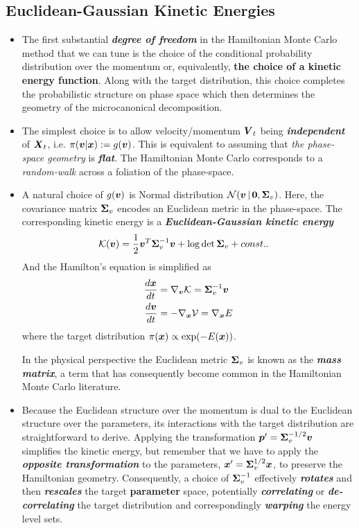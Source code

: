 \documentclass[11pt]{article}
\begin{document}
\subsection{Euclidean-Gaussian Kinetic Energies}
\begin{itemize}
\item The first substantial \textbf{\emph{degree of freedom}} in the Hamiltonian Monte Carlo method that we can tune is the choice of the conditional probability distribution over the momentum or, equivalently, \textbf{the choice of a kinetic energy function}. Along with the target distribution, this choice completes the probabilistic structure on phase space which then determines the geometry of the microcanonical decomposition.

\item The simplest choice is to allow velocity/momentum $\boldsymbol{V}_{t}$ being \textbf{\emph{independent}} of $\boldsymbol{X}_{t}$, i.e. $\pi(\boldsymbol{v}|\boldsymbol{x}):= g(\boldsymbol{v})$. This is equivalent to assuming that \emph{the phase-space geometry} is \emph{\textbf{flat}}. The Hamiltonian Monte Carlo corresponds to a \emph{random-walk} across a foliation of the phase-space.

\item A natural choice of $g(\boldsymbol{v})$ is Normal distribution ${\mathcal N}(\boldsymbol{v}\,|\, \boldsymbol{0}, \boldsymbol{\Sigma}_{v})$. Here, the covariance matrix $\boldsymbol{\Sigma}_{v}$ encodes an Euclidean metric in the phase-space. The corresponding kinetic energy is a \emph{\textbf{Euclidean-Gaussian kinetic energy}}
\begin{align}
{\mathcal K}(\boldsymbol{v}) &= \frac{1}{2}\boldsymbol{v}^{T} \boldsymbol{\Sigma}_{v}^{-1} \boldsymbol{v} + \log \det{\boldsymbol{\Sigma}_{v}} + const.. \label{eqn: hmc_quatratic_kinetic}
\end{align}   And the Hamilton's equation is simplified as 
\begin{align}
\frac{d \boldsymbol{x}}{dt} &= \nabla_{\boldsymbol{v}}{{\mathcal K}} = \boldsymbol{\Sigma}_{v}^{-1} \boldsymbol{v}  \nonumber\\
\frac{d \boldsymbol{v}}{dt} &= - \nabla_{\boldsymbol{x}}{{\mathcal V}} = \nabla_{\boldsymbol{x}}{E} \label{eqn: hmc_hamiltonian_eqn_quar_k}
\end{align} where the target distribution $\pi(\boldsymbol{x}) \propto \exp(-E(\boldsymbol{x}))$.

In the physical perspective the Euclidean metric $\boldsymbol{\Sigma}_{v}$ is known as the \emph{\textbf{mass matrix}}, a term that has consequently become common in the Hamiltonian Monte Carlo literature.

\item Because the Euclidean structure over the momentum is dual to the Euclidean structure over the parameters, its interactions with the target distribution are straightforward to derive. Applying the transformation $\boldsymbol{p}' = \boldsymbol{\Sigma}_v^{-1/2}\boldsymbol{v}$ simplifies the kinetic energy, but remember that we have to apply the \emph{\textbf{opposite transformation}} to the parameters, $\boldsymbol{x}' = \boldsymbol{\Sigma}_v^{1/2}\boldsymbol{x}$, to preserve the Hamiltonian geometry.  Consequently, a choice of $\boldsymbol{\Sigma}_{v}^{-1}$ effectively \emph{\textbf{rotates}} and then \emph{\textbf{rescales}} the target \textbf{parameter} space, potentially \emph{\textbf{correlating}} or \textbf{\emph{de-correlating}} the target distribution and correspondingly \emph{\textbf{warping}} the energy level sets.


\end{itemize}
\end{document}

